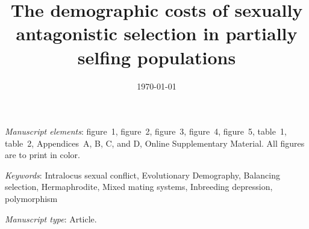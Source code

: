 \documentclass[11pt]{article}
\begin{document}
\title{The demographic costs of sexually antagonistic selection in partially selfing populations}





\date{\today}
\maketitle




\bigskip

\textit{Manuscript elements}: figure~1, figure~2, figure~3, figure~4, figure~5, table~1, table~2, Appendices~A, B, C, and D, Online Supplementary Material. All figures are to print in color.

\bigskip

\textit{Keywords}: Intralocus sexual conflict, Evolutionary Demography, Balancing selection, Hermaphrodite, Mixed mating systems, Inbreeding depression, polymorphism 

\bigskip

\textit{Manuscript type}: Article. %

\bigskip

\end{document}
